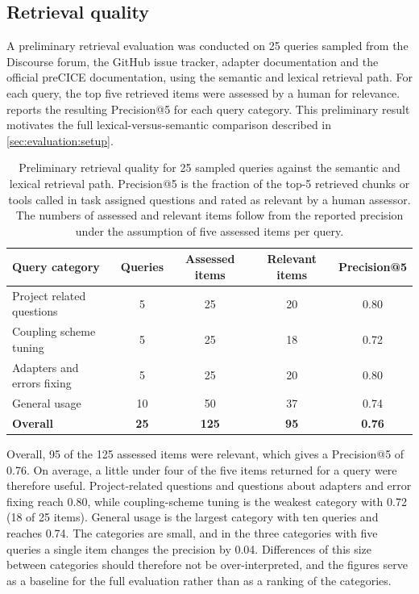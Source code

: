 \documentclass[
  numbers=noenddot,
  english,
  a4paper,
  twoside,
  bibliography=totoc,
  headsepline,
  cleardoublepage=empty,
  parskip=half,
  draft=false
]{scrbook}
\theoremstyle{break}
\renewcommand{\_}{\textunderscore\allowbreak}
\begin{document}
\subsection{Retrieval quality}\label{sec:evaluation:results:retrieval}

A preliminary retrieval evaluation was conducted on 25 queries sampled from the Discourse forum,
the GitHub issue tracker, adapter documentation and the official preCICE documentation, using the semantic and lexical
retrieval path. For each query, the top five retrieved items were assessed by a human for relevance.
 reports the resulting Precision@5 for each query category.
This preliminary result motivates the full lexical-versus-semantic comparison described in
\cref{sec:evaluation:setup}.


\begin{table}[htbp]
  \caption{Preliminary retrieval quality for 25 sampled queries against the semantic and lexical retrieval
           path. Precision@5 is the fraction of the top-5 retrieved chunks or tools called in task
           assigned questions and rated as relevant by a human assessor. The numbers of assessed
           and relevant items follow from the reported precision under the assumption of five
           assessed items per query.}
  \label{tab:retrieval-prelim}
  \centering
  \begin{tabular}{lcccc}
    \toprule
    \textbf{Query category}       & \textbf{Queries} & \textbf{Assessed items} &
    \textbf{Relevant items} & \textbf{Precision@5} \\
    \midrule
    Project related questions     & 5                & 25                      & 20 & 0.80 \\
    Coupling scheme tuning        & 5                & 25                      & 18 & 0.72 \\
    Adapters and errors fixing    & 5                & 25                      & 20 & 0.80 \\
    General usage                 & 10               & 50                      & 37 & 0.74 \\
    \midrule
    \textbf{Overall}              & \textbf{25}      & \textbf{125}            &
    \textbf{95}             & \textbf{0.76} \\
    \bottomrule
  \end{tabular}
\end{table}

Overall, 95 of the 125 assessed items were relevant, which gives a Precision@5 of 0.76.
On average, a little under four of the five items returned for a query were therefore useful.
Project-related questions and questions about adapters and error fixing reach 0.80, while
coupling-scheme tuning is the weakest category with 0.72 (18 of 25 items).
General usage is the largest category with ten queries and reaches 0.74.
The categories are small, and in the three categories with five queries a single item changes
the precision by 0.04.
Differences of this size between categories should therefore not be over-interpreted, and the
figures serve as a baseline for the full evaluation rather than as a ranking of the categories.
\end{document}
